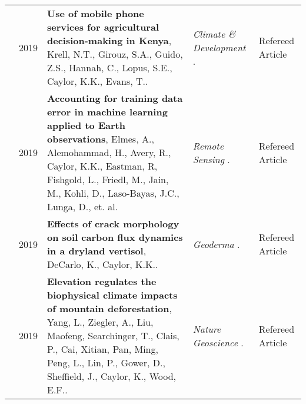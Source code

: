 \begin{longtable}{lcp{7.75cm}>{\raggedright}p{5.25cm}p{1.75cm}}
     & 2019 & {\bf Use of mobile phone services for agricultural decision-making in Kenya}, Krell, N.T., Girouz, S.A., Guido, Z.S., Hannah, C., Lopus, S.E., Caylor, K.K., Evans, T..  & \emph{ Climate \& Development } .   & Refereed Article\\
     & 2019 & {\bf Accounting for training data error in machine learning applied to 
Earth observations}, Elmes, A., Alemohammad, H., Avery, R., Caylor, K.K., Eastman, R, Fishgold, L., Friedl, M., Jain, M., Kohli, D., Laso-Bayas, J.C., Lunga, D., et. al.  & \emph{ Remote Sensing } .   & Refereed Article\\
     & 2019 & {\bf Effects of crack morphology on soil carbon flux dynamics in a dryland vertisol}, DeCarlo, K., Caylor, K.K..  & \emph{ Geoderma } .   & Refereed Article\\
     & 2019 & {\bf Elevation regulates the biophysical climate impacts of mountain deforestation}, Yang, L., Ziegler, A., Liu, Maofeng, Searchinger, T., Clais, P., Cai, Xitian, Pan, Ming, Peng, L., Lin, P., Gower, D., Sheffield, J., Caylor, K., Wood, E.F..  & \emph{ Nature Geoscience } .   & Refereed Article\\
\end{longtable}
